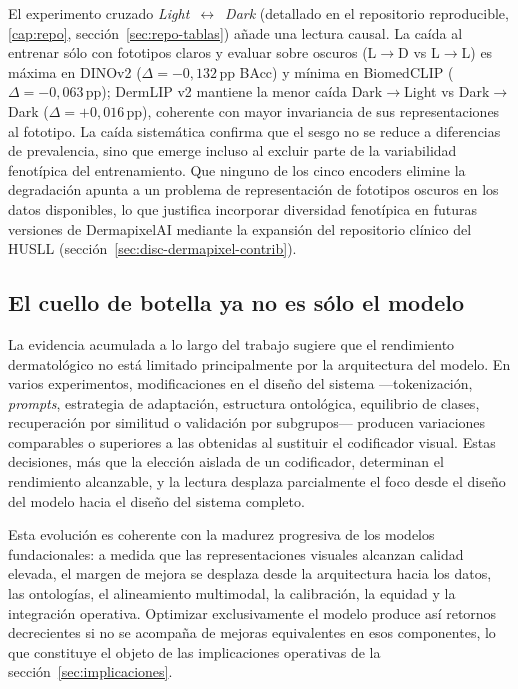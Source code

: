 El experimento cruzado \emph{Light}~$\leftrightarrow$~\emph{Dark}
(detallado en el repositorio reproducible, \ref{cap:repo},
sección~\ref{sec:repo-tablas}) añade una lectura causal. La caída al
entrenar sólo con fototipos claros y evaluar sobre oscuros (L$\to$D vs
L$\to$L) es máxima en DINOv2 ($\Delta = -0{,}132$\,pp BAcc) y mínima en
BiomedCLIP ($\Delta = -0{,}063$\,pp); DermLIP v2 mantiene la menor caída
Dark$\to$Light vs Dark$\to$Dark ($\Delta = +0{,}016$\,pp), coherente con
mayor invariancia de sus representaciones al fototipo. La caída
sistemática confirma que el sesgo no se reduce a diferencias de
prevalencia, sino que emerge incluso al excluir parte de la variabilidad
fenotípica del entrenamiento. Que ninguno de los cinco encoders elimine
la degradación apunta a un problema de representación de fototipos
oscuros en los datos disponibles, lo que justifica incorporar diversidad
fenotípica en futuras versiones de DermapixelAI mediante la expansión del
repositorio clínico del HUSLL (sección~\ref{sec:disc-dermapixel-contrib}).

\subsection{El cuello de botella ya no es sólo el modelo}
\label{sec:disc-cuello-botella}

La evidencia acumulada a lo largo del trabajo sugiere que el rendimiento
dermatológico no está limitado principalmente por la arquitectura del
modelo. En varios experimentos, modificaciones en el diseño del sistema
---tokenización, \emph{prompts}, estrategia de adaptación, estructura
ontológica, equilibrio de clases, recuperación por similitud o
validación por subgrupos--- producen variaciones comparables o
superiores a las obtenidas al sustituir el codificador visual. Estas
decisiones, más que la elección aislada de un codificador, determinan el
rendimiento alcanzable, y la lectura desplaza parcialmente el foco desde
el diseño del modelo hacia el diseño del sistema completo.

Esta evolución es coherente con la madurez progresiva de los modelos
fundacionales: a medida que las representaciones visuales alcanzan
calidad elevada, el margen de mejora se desplaza desde la arquitectura
hacia los datos, las ontologías, el alineamiento multimodal, la
calibración, la equidad y la integración operativa. Optimizar
exclusivamente el modelo produce así retornos decrecientes si no se
acompaña de mejoras equivalentes en esos componentes, lo que constituye
el objeto de las implicaciones operativas de la
sección~\ref{sec:implicaciones}.

